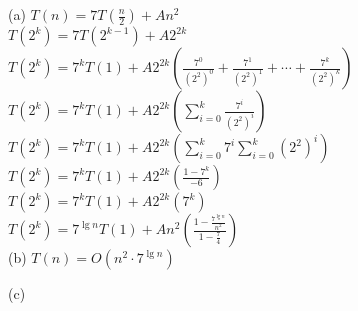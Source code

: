 
(a)
$T(n) = 7T(\frac{n}{2}) + An^2$\\

$T(2^k) = 7T(2^{k-1}) + A2^{2k}$\\

$T(2^k) = 7^kT(1) + A2^{2k}(\frac{7^0}{(2^2)^0} + \frac{7^1}{(2^2)^1} + \cdots + \frac{7^k}{(2^2)^k})$\\

$T(2^k) = 7^kT(1) + A2^{2k}(\sum^{k}_{i=0}\frac{7^i}{(2^2)^i})$\\

$T(2^k) = 7^kT(1) + A2^{2k}(\sum^{k}_{i=0}7^i \sum^{k}_{i=0}(2^2)^i)$\\

$T(2^k) = 7^kT(1) + A2^{2k}(\frac{1-7^k}{-6})$\\

$T(2^k) = 7^kT(1) + A2^{2k}(7^k)$\\

$T(2^k) = 7^{\lg n}T(1) + An^2(\frac{1-\frac{7^{\lg n}}{n^2}}{1-\frac{7}{4}})$\\


(b) $T(n) = O(n^2\cdot 7^{\lg n})$

(c)
